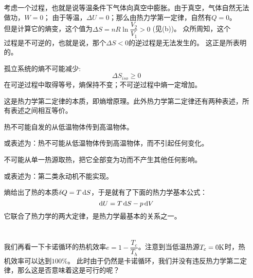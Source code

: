             考虑一个过程，也就是说等温条件下气体向真空中膨胀。由于真空，气体自然无法做功，$W=0$；
            由于等温，$\Delta U=0$；那么由热力学第一定律，自然有$Q=0$。\\[1ex]但是计算它的熵变，这个值为$\Delta S = nR\ln\dfrac{V_2}{V_1}>0$ (见(b))。
            众所周知，这个\\[1ex]过程是不可逆的，也就是说，那个$\Delta S<0$的逆过程是无法发生的。
            这正是\linebreak{}所表明的。
            \begin{law}
                孤立系统的熵不可能减少:
                \begin{equation}
                    \Delta S_{iso} \geq 0
                    \nonumber
                \end{equation}
                在可逆过程中取得等号，熵保持不变；不可逆过程中熵一定增加。
            \end{law}
            这是热力学第二定律的本质，即熵增原理。此外热力学第二定律还有两种表述，所有表述之间相互等价。
            \begin{law}
                热不可能自发的从低温物体传到高温物体。

                或表述为：热不可能从低温物体传到高温物体，而不引起任何变化。
            \end{law}
            \begin{law}
                不可能从单一热源取热，把它全部变为功而不产生其他任何影响。

                或表述为：第二类永动机不能实现。
            \end{law}
            熵给出了热的本质$\delta{Q} = T\dif{S}$，于是就有了下面的热力学基本公式：
            \begin{equation}
                \dif{U} = T\dif{S}-p\dif{V}
                \nonumber
            \end{equation}
            它联合了热力学的两大定律，是热力学最基本的关系之一。
    \section[热力学第三定律]{}
        我们再看一下卡诺循环的热机效率$e = 1-\dfrac{T_c}{T_h}$。注意到当低温热源$T_c = 0 \rm{K}$时，热机效率可以达到$100\%$。
        此时由于仍然是卡诺循环，我们并没有违反热力学第二定律，那么这是否意味着这是可行的呢？

